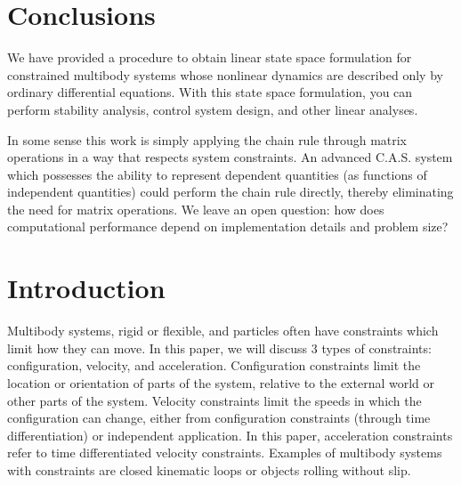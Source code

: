 \documentclass[smallcondensed]{svjour3}                     %
\begin{document}
\section{Conclusions}
\label{sec:conclusions}
We have provided a procedure to obtain linear state space formulation for
constrained multibody systems whose nonlinear dynamics are described only by
ordinary differential equations. With this state space formulation, you can
perform stability analysis, control system design, and other linear analyses.

In some sense this work is simply applying the chain rule through matrix
operations in a way that respects system constraints. An advanced C.A.S. system
which possesses the ability to represent dependent quantities (as functions of
independent quantities) could perform the chain rule directly, thereby
eliminating the need for matrix operations. We leave an open question: how does
computational performance depend on implementation details and problem size?


\section{Introduction}
\label{sec:intro}
Multibody systems, rigid or flexible, and particles often have constraints
which limit how they can move. In this paper, we will discuss 3 types of
constraints: configuration, velocity, and acceleration. Configuration
constraints limit the location or orientation of parts of the system, relative
to the external world or other parts of the system. Velocity constraints limit
the speeds in which the configuration can change, either from configuration
constraints (through time differentiation) or independent application. In this
paper, acceleration constraints refer to time differentiated velocity
constraints. Examples of multibody systems with constraints are closed
kinematic loops or objects rolling without slip.
\end{document}
